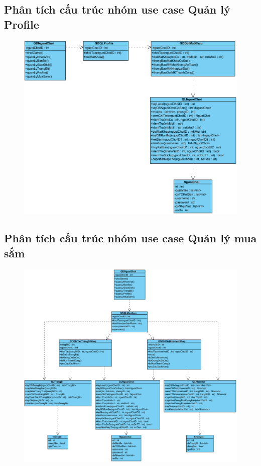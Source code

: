 \documentclass[3p]{elsarticle}
\begin{document}
\subsection{Phân tích cấu trúc nhóm use case Quản lý Profile}
\begin{figure}[!htbp]
	\hspace*{-.5in}
	\centering
	\includegraphics[scale=.55]{images/structure-pdfs/gamer/ProfileManagement.pdf}
\end{figure}
\newpage
\subsection{Phân tích cấu trúc nhóm use case Quản lý mua sắm}
\begin{figure}[!htbp]
	\hspace*{-.5in}
	\centering
	\includegraphics[scale=.55]{images/structure-pdfs/gamer/ShopManagement.pdf}
\end{figure}
\newpage
\end{document}
